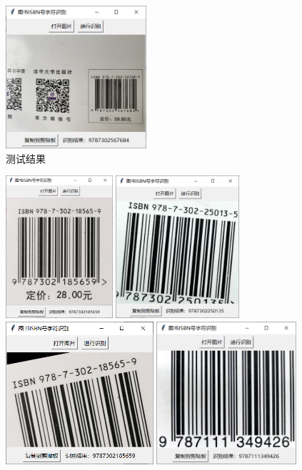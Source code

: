 \documentclass{ctexart}
\begin{document}
\begin{figure}[H]
    \includegraphics[height=150pt]{test_06}
    \caption{测试结果}
\end{figure}
\begin{figure}[H]
    \centering
    \includegraphics[height=150pt]{test_07}\quad
    \includegraphics[height=150pt]{test_08}\\
    \includegraphics[height=150pt]{test_09}\quad
    \includegraphics[height=150pt]{test_10}\\

\end{figure}
\end{document}
